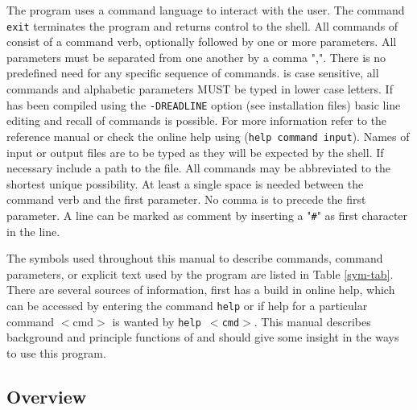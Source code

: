 The program uses a command language to interact with the user.  The
command {\tt exit} terminates the program and returns control to the
shell.  All commands of \Suite consist of a command verb,
optionally followed by one or more parameters.  All parameters must
be separated from one another by a comma ",".  There is no
predefined need for any specific sequence of commands.  \Suite     
is case sensitive, all commands and alphabetic parameters MUST be
typed in lower case letters.  If \Suite has been compiled
using the {\tt -DREADLINE} option (see installation files) basic
line editing and recall of commands is possible.  For more
information refer to the reference manual or check the online help
using ({\tt help command input}).  Names of input or output files
are to be typed as they will be expected by the shell.  If necessary
include a path to the file.  All commands may be abbreviated to the
shortest unique possibility. At least a single space is needed
between the command verb and the first parameter.  No comma is to
precede the first parameter. A line can be marked as comment by
inserting a "{\tt \#}" as first character in the line.\par

The symbols used throughout this manual to describe commands,
command parameters, or explicit text used by the program \Suite     
are listed in Table \ref{sym-tab}. There are several sources
of information, first \Suite  has a build in online help, which
can be accessed by entering the command {\tt help} or if help for a
particular command $<$cmd$>$ is wanted by {\tt help $<$cmd$>$}. This
manual describes background and principle functions of \Suite
and should give some insight in the ways to use this program. \par

\subsection{Overview}

